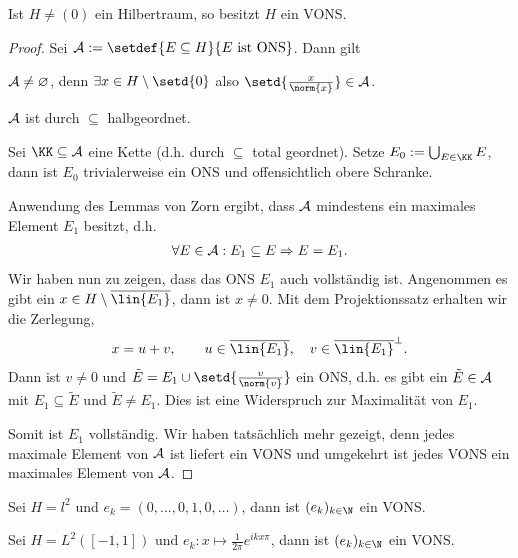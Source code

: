 \begin{prop}
\label{prop:5.23}
Ist $H\neq(0)$ ein Hilbertraum, so besitzt $H$ ein VONS.\fishhere
\end{prop}
\begin{proof}
Sei $\AA:= \setdef{E\subseteq H}{E\text{ ist ONS}}$. Dann gilt
\begin{proofenum}
  \item $\AA\neq \varnothing$, denn $\exists x\in H\setminus\setd{0}$ also
  $\setd{\frac{x}{\norm{x}}}\in\AA$.
  \item $\AA$ ist durch $\subseteq$ halbgeordnet.
  \item Sei $\KK\subseteq\AA$ eine Kette (d.h. durch $\subseteq$ total
  geordnet). Setze $E_0 := \bigcup_{E\in\KK} E$, dann ist $E_0$ trivialerweise ein ONS und
  offensichtlich obere Schranke.
\end{proofenum}
Anwendung des Lemmas von Zorn ergibt, dass $\AA$ mindestens ein maximales
Element $E_1$ besitzt, d.h.
\begin{align*}
\forall E\in \AA : E_1\subseteq E \Rightarrow E=E_1.
\end{align*}
Wir haben nun zu zeigen, dass das ONS $E_1$ auch vollständig ist. Angenommen es
gibt ein $x\in H\setminus\overline{\lin{E_1}}$, dann ist $x\neq 0$. Mit dem
Projektionssatz erhalten wir die Zerlegung,
\begin{align*}
x = u+v,\qquad u\in \overline{\lin{E_1}},\quad v\in \overline{\lin{E_1}}^\bot.
\end{align*}
Dann ist $v\neq 0$ und $\tilde{E}=E_1\cup\setd{\frac{v}{\norm{v}}}$ ein ONS,
d.h. es gibt ein $\tilde{E}\in \AA$ mit $E_1\subseteq \tilde{E}$ und
$\tilde{E}\neq E_1$. Dies ist eine Widerspruch zur Maximalität von $E_1$.

Somit ist $E_1$ vollständig. Wir haben tatsächlich mehr gezeigt, 
denn jedes maximale Element von $\AA$ ist liefert ein VONS und umgekehrt ist
jedes VONS ein maximales Element von $\AA$.\qedhere
\end{proof}

\begin{bsp}
\label{bsp:5.24}
\begin{bspenum}
  \item Sei $H=l^2$ und $e_k = (0,\ldots,0,1,0,\ldots)$, dann ist
  $(e_k)_{k\in\N}$ ein VONS.
  \item Sei $H=L^2([-1,1])$ und $e_k : x\mapsto \frac{1}{2\pi}e^{ikx\pi}$, dann
  ist $(e_k)_{k\in\N}$ ein VONS.\bsphere
\end{bspenum}
\end{bsp}

